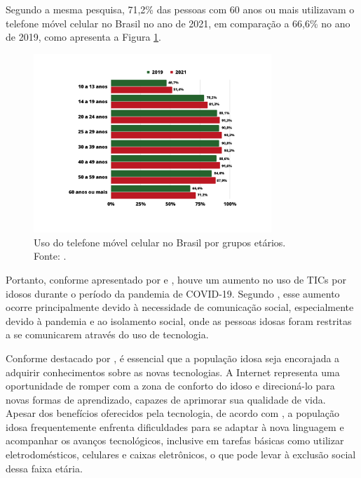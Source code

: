 Segundo a mesma pesquisa, 71,2\% das pessoas com 60 anos ou mais utilizavam o telefone móvel celular no Brasil no ano de 2021, em comparação a 66,6\% no ano de 2019, como apresenta a Figura \ref{fig:uso_celular}.
\vspace{-10pt}
\begin{figure}[H]
    \centering
    \includegraphics[width=0.8\textwidth]{figuras/uso_celular.pdf}
    \vspace{-40pt}
    \caption{Uso do telefone móvel celular no Brasil por grupos etários.\\ 
    Fonte: .}
    \label{fig:uso_celular}
\end{figure}

Portanto, conforme apresentado por  e , houve um aumento no uso de TICs por idosos durante o período da pandemia de COVID-19. Segundo , esse aumento ocorre principalmente devido à necessidade de comunicação social, especialmente devido à pandemia e ao isolamento social, onde as pessoas idosas foram restritas a se comunicarem através do uso de tecnologia.

Conforme destacado por , é essencial que a população idosa seja encorajada a adquirir conhecimentos sobre as novas tecnologias. A Internet representa uma oportunidade de romper com a zona de conforto do idoso e direcioná-lo para novas formas de aprendizado, capazes de aprimorar sua qualidade de vida. Apesar dos benefícios oferecidos pela tecnologia, de acordo com , a população idosa frequentemente enfrenta dificuldades para se adaptar à nova linguagem e acompanhar os avanços tecnológicos, inclusive em tarefas básicas como utilizar eletrodomésticos, celulares e caixas eletrônicos, o que pode levar à exclusão social dessa faixa etária. 


